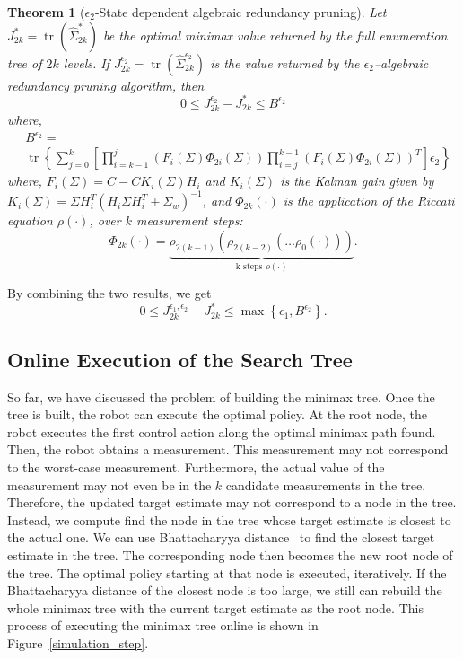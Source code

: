 \documentclass[journal]{IEEEtran}
\DeclareMathOperator{\Tr}{tr}
\newtheorem{theorem}{Theorem}
\begin{document}
\begin{theorem}
[$\epsilon_2$-State dependent algebraic redundancy pruning]
Let $J_{2k}^\ast=\Tr(\hat{\Sigma}_{2k}^\ast)$ be the optimal minimax value returned by the full enumeration tree of $2k$ levels. If $J_{2k}^{\epsilon_2}=\Tr(\hat{\Sigma}_{2k}^{\epsilon_2})$ is the value returned by the $\epsilon_2$--algebraic redundancy pruning algorithm, then
$$
0\leq  J_{2k}^{\epsilon_2}-J_{2k}^\ast \leq B^{\epsilon_2}$$
where,
\begin{align*}
&B^{\epsilon_2} =\\
&\Tr\left\{  \sum^k_{j=0} \left[ \prod^j_{i=k-1}\left( F_i(\Sigma) \Phi_{2i}(\Sigma)\right)  \prod^{k-1}_{i=j}\left(  F_i(\Sigma) \Phi_{2i}(\Sigma)\right)^T \right]\epsilon_2 
 \right\}
 \end{align*}
where, $F_i(\Sigma)=C-CK_i(\Sigma)H_i$ and $K_i(\Sigma)$ is the Kalman gain given by $K_i(\Sigma)=\Sigma H_i^T(H_i\Sigma H^T_i+\Sigma_{w})^{-1}$, and $\Phi_{2k}(\cdot)$ is the application of the Riccati equation $\rho(\cdot)$, over $k$ measurement steps: 
$$\Phi_{2k}(\cdot) = \underbrace{\rho_{2(k-1)}(\rho_{2(k-2)}( \dots \rho_0(\cdot)))}_{\text{k  steps  }\rho(\cdot)}. $$
\label{thm:epsilon2bound}
\end{theorem}

By combining the two results, we get
$$0\leq  J_{2k}^{\epsilon_1,\epsilon_2}-J_{2k}^\ast \leq \max \left\lbrace \epsilon_1,B^{\epsilon_2} \right\rbrace.$$

\subsection{Online Execution of the Search Tree}  
\label{sec:online}

So far, we have discussed the problem of building the minimax tree. Once the tree is built, the robot can execute the optimal policy. At the root node, the robot executes the first control action along the optimal minimax path found. Then, the robot obtains a measurement. This measurement may not correspond to the worst-case measurement. Furthermore, the actual value of the measurement may not even be in the $k$ candidate measurements in the tree. Therefore, the updated target estimate may not correspond to a node in the tree. Instead, we compute find the node in the tree whose target estimate is closest to the actual one. We can use Bhattacharyya distance~\cite{bhattacharyya1943measure} to find the closest target estimate in the tree. The corresponding node then becomes the new root node of the tree. The optimal policy starting at that node is executed, iteratively. If the Bhattacharyya distance of the closest node is too large, we still can rebuild the whole minimax tree with the current target estimate as the root node. This process of executing the minimax tree online is shown in Figure~\ref{simulation_step}. 
\end{document}
